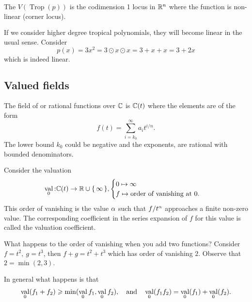 \documentclass[12pt]{memoir}
\DeclareMathOperator{\val}{val}
\DeclareMathOperator{\Trop}{Trop}
\begin{document}
\begin{Def}
    The  $V(\Trop(p))$ is the codimension 1 locus in $\mathbb{R}^n$ where the function is non-linear (corner locus).
\end{Def}

\begin{Ex}
If we consider higher degree tropical polynomials, they will become linear in the usual sense. Consider 
$$p(x)=3x^2=3\odot x\odot x=3+x+x=3+2x$$
which is indeed linear.
\end{Ex}

\subsection{Valued fields}

\begin{Def}
The field of  or rational functions over $\mathbb{C}$ is $\mathbb{C}(t)$ where the elements are of the form 
$$f(t)=\sum_{i=k_0}^\infty a_it^{i/n}.$$
The lower bound $k_0$ could be negative and the exponents, are rational with bounded denominators. 
\end{Def}

Consider the valuation 
$$\val_0\:\bC(t)\to\bR\cup\set{\infty},\begin{cases}
    0\mapsto \infty\\
    f\mapsto\text{order of vanishing at }0.
\end{cases}$$
This order of vanishing is the value $\alpha$ such that $f/t^\alpha$ approaches a finite non-zero value. The corresponding coefficient in the series expansion of $f$ for this value is called the valuation coefficient.

\begin{Ex}
    What happens to the order of vanishing when you add two functions? Consider $f=t^2,\ g=t^3$, then $f+g=t^2+t^3$ which has order of vanishing $2$. Observe that $2=\min(2,3)$.
\end{Ex}
In general what happens is that
$$\val_0(f_1+f_2)\geq\min(\val_0 f_1,\val_0 f_2),\word{and}\val_0(f_1f_2)=\val_0(f_1)+\val_0(f_2).$$
\end{document}
